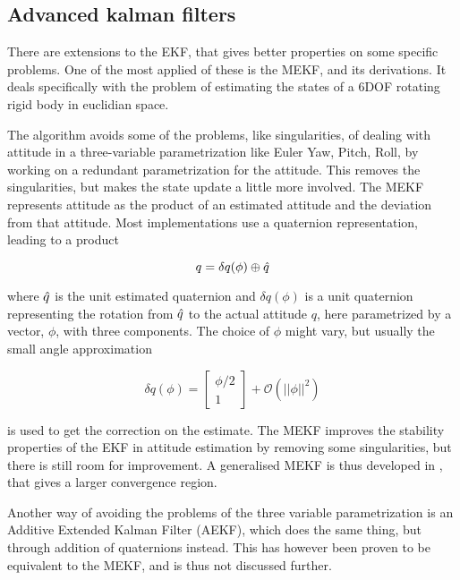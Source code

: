 
\subsection{Advanced kalman filters}
There are extensions to the EKF, that gives better properties on some specific problems. One of the most applied of these is the \gls{MEKF}\cite{MEKF}, and its derivations. It deals specifically with the problem of estimating the states of a 6DOF rotating rigid body in euclidian space. 

The algorithm avoids some of the problems, like singularities, of dealing with attitude in a three-variable parametrization like Euler Yaw, Pitch, Roll, by working on a redundant parametrization for the attitude. This removes the singularities, but makes the state update a little more involved. The MEKF represents attitude as the product of an estimated attitude and the deviation from that attitude. Most implementations use a quaternion representation, leading to a product 

\begin{equation}
    q = \delta q(\phi)\oplus \Hat{q}
\end{equation}

where $\Hat{q}$ is the unit estimated quaternion and $\delta q(\phi)$ is a unit quaternion representing the rotation from $\Hat{q}$ to the actual attitude $q$, here parametrized by a vector, $\phi$, with three components. The choice of $\phi$ might vary, but usually the small angle approximation

\begin{equation}
    \delta q(\phi) = \begin{bmatrix} \phi / 2 \\ 1 \end{bmatrix} + \mathcal{O}(||\phi||^2)
\end{equation}

is used to get the correction on the estimate. The MEKF improves the stability properties of the EKF in attitude estimation by removing some singularities, but there is still room for improvement. A generalised MEKF is thus developed in \cite{GMEKF}, that gives a larger convergence region. 

Another way of avoiding the problems of the three variable parametrization is an Additive Extended Kalman Filter (AEKF), which does the same thing, but through addition of quaternions instead. This has however been proven to be equivalent to the MEKF\cite{AEKF}, and is thus not discussed further.

